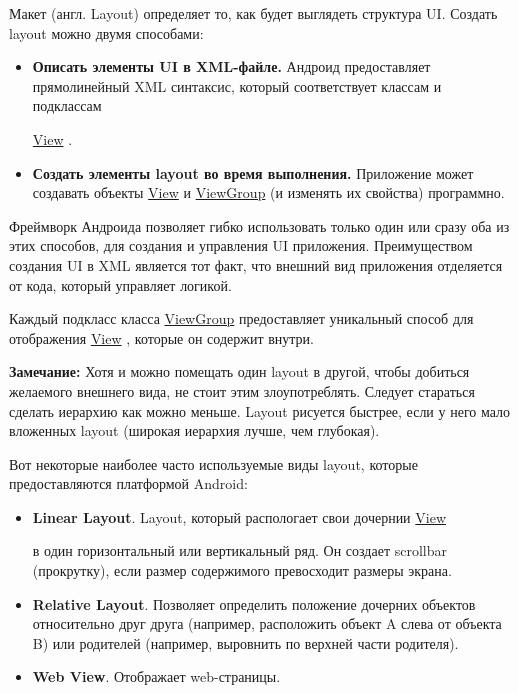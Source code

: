 \newcommand{\View}{
  \href{https://developer.android.com/reference/android/view/View.html}{View}
}

\newcommand{\ViewGroup}{
  \href{https://developer.android.com/reference/android/view/ViewGroup.html}{ViewGroup}
}

\newcommand{\AdapterView}{
  \href{https://developer.android.com/reference/android/widget/AdapterView.html}{AdapterView}
}

\newcommand{\Adapter}{
  \href{https://developer.android.com/reference/android/widget/Adapter.html}{Adapter}
}



Макет (англ. Layout) определяет то, как будет выглядеть структура UI. Создать
layout можно двумя способами:
\begin{itemize}
  \item \textbf{Описать элементы UI в XML-файле.} Андроид предоставляет
  прямолинейный XML синтаксис, который соответствует классам и подклассам
  \View.
  
  \item \textbf{Создать элементы layout во время выполнения.} Приложение может
  создавать объекты \View и \ViewGroup (и изменять их свойства) программно. 
\end{itemize}

Фреймворк Андроида позволяет гибко использовать только один или сразу оба из
этих способов, для создания и управления UI приложения.
Преимуществом создания UI в XML является тот факт, что внешний вид приложения
отделяется от кода, который управляет логикой.


Каждый подкласс класса \ViewGroup предоставляет уникальный способ для
отображения \View, которые он содержит внутри.

\textbf{Замечание:} Хотя и можно помещать один layout в другой, чтобы добиться
желаемого внешнего вида, не стоит этим злоупотреблять. Следует стараться
сделать иерархию как можно меньше. Layout рисуется быстрее, если у него мало
вложенных layout (широкая иерархия лучше, чем глубокая).

Вот некоторые наиболее часто используемые виды layout, которые предоставляются
платформой Android:
\begin{itemize}
  \item \textbf{Linear Layout}. Layout, который распологает свои дочернии \View
  в один горизонтальный или вертикальный ряд. Он создает scrollbar (прокрутку),
  если размер содержимого превосходит размеры экрана.
  
  \item \textbf{Relative Layout}. Позволяет определить положение дочерних
  объектов относительно друг друга (например, расположить объект A слева от
  объекта B) или родителей (например, выровнить по верхней части родителя).
  
  \item \textbf{Web View}. Отображает web-страницы.
\end{itemize}

